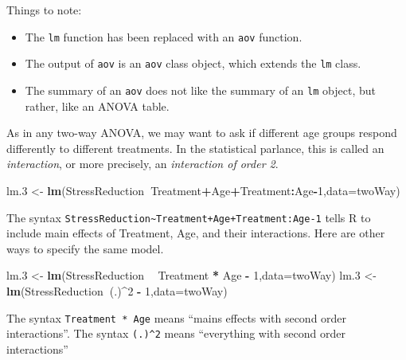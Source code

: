 \documentclass[]{book}
\newenvironment{Shaded}{\begin{snugshade}}{\end{snugshade}}
\newcommand{\KeywordTok}[1]{\textcolor[rgb]{0.13,0.29,0.53}{\textbf{#1}}}
\newcommand{\DataTypeTok}[1]{\textcolor[rgb]{0.13,0.29,0.53}{#1}}
\newcommand{\DecValTok}[1]{\textcolor[rgb]{0.00,0.00,0.81}{#1}}
\newcommand{\StringTok}[1]{\textcolor[rgb]{0.31,0.60,0.02}{#1}}
\newcommand{\OperatorTok}[1]{\textcolor[rgb]{0.81,0.36,0.00}{\textbf{#1}}}
\newcommand{\NormalTok}[1]{#1}
\providecommand{\tightlist}{%
  \setlength{\itemsep}{0pt}\setlength{\parskip}{0pt}}
\theoremstyle{definition}
\theoremstyle{definition}
\theoremstyle{definition}
\theoremstyle{remark}
\begin{document}
Things to note:

\begin{itemize}
\tightlist
\item
  The \texttt{lm} function has been replaced with an \texttt{aov}
  function.
\item
  The output of \texttt{aov} is an \texttt{aov} class object, which
  extends the \texttt{lm} class.
\item
  The summary of an \texttt{aov} does not like the summary of an
  \texttt{lm} object, but rather, like an ANOVA table.
\end{itemize}

As in any two-way ANOVA, we may want to ask if different age groups
respond differently to different treatments. In the statistical
parlance, this is called an \emph{interaction}, or more precisely, an
\emph{interaction of order 2}.

\begin{Shaded}
\begin{Highlighting}[]
\NormalTok{lm.}\DecValTok{3}\NormalTok{ <-}\StringTok{ }\KeywordTok{lm}\NormalTok{(StressReduction}\OperatorTok{~}\NormalTok{Treatment}\OperatorTok{+}\NormalTok{Age}\OperatorTok{+}\NormalTok{Treatment}\OperatorTok{:}\NormalTok{Age}\OperatorTok{-}\DecValTok{1}\NormalTok{,}\DataTypeTok{data=}\NormalTok{twoWay)}
\end{Highlighting}
\end{Shaded}

The syntax
\texttt{StressReduction\textasciitilde{}Treatment+Age+Treatment:Age-1}
tells R to include main effects of Treatment, Age, and their
interactions. Here are other ways to specify the same model.

\begin{Shaded}
\begin{Highlighting}[]
\NormalTok{lm.}\DecValTok{3}\NormalTok{ <-}\StringTok{ }\KeywordTok{lm}\NormalTok{(StressReduction }\OperatorTok{~}\StringTok{ }\NormalTok{Treatment }\OperatorTok{*}\StringTok{ }\NormalTok{Age }\OperatorTok{-}\StringTok{ }\DecValTok{1}\NormalTok{,}\DataTypeTok{data=}\NormalTok{twoWay)}
\NormalTok{lm.}\DecValTok{3}\NormalTok{ <-}\StringTok{ }\KeywordTok{lm}\NormalTok{(StressReduction}\OperatorTok{~}\NormalTok{(.)}\OperatorTok{^}\DecValTok{2} \OperatorTok{-}\StringTok{ }\DecValTok{1}\NormalTok{,}\DataTypeTok{data=}\NormalTok{twoWay)}
\end{Highlighting}
\end{Shaded}

The syntax \texttt{Treatment\ *\ Age} means ``mains effects with second
order interactions''. The syntax \texttt{(.)\^{}2} means ``everything
with second order interactions''
\end{document}
